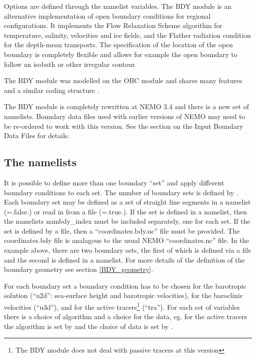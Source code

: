 Options are defined through the   
  namelist variables.
The BDY module is an alternative implementation of open boundary
conditions for regional configurations. It implements the Flow
Relaxation Scheme algorithm for temperature, salinity, velocities and
ice fields, and the Flather radiation condition for the depth-mean
transports. The specification of the location of the open boundary is
completely flexible and allows for example the open boundary to follow
an isobath or other irregular contour. 

The BDY module was modelled on the OBC module and shares many features
and a similar coding structure \citep{Chanut2005}.

The BDY module is completely rewritten at NEMO 3.4 and there is a new
set of namelists. Boundary data files used with earlier versions of
NEMO may need to be re-ordered to work with this version. See the
section on the Input Boundary Data Files for details.

\subsection{The namelists}
\label{BDY_namelist}

It is possible to define more than one boundary ``set'' and apply
different boundary conditions to each set. The number of boundary
sets is defined by .  Each boundary set may be defined
as a set of straight line segments in a namelist
(=.false.) or read in from a file
(=.true.). If the set is defined in a namelist,
then the namelists nambdy\_index must be included separately, one for
each set. If the set is defined by a file, then a
``coordinates.bdy.nc'' file must be provided. The coordinates.bdy file
is analagous to the usual NEMO ``coordinates.nc'' file. In the example
above, there are two boundary sets, the first of which is defined via
a file and the second is defined in a namelist. For more details of
the definition of the boundary geometry see section
\ref{BDY_geometry}.

For each boundary set a boundary
condition has to be chosen for the barotropic solution (``u2d'':
sea-surface height and barotropic velocities), for the baroclinic
velocities (``u3d''), and for the active tracers\footnote{The BDY
  module does not deal with passive tracers at this version}
(``tra''). For each set of variables there is a choice of algorithm
and a choice for the data, eg. for the active tracers the algorithm is
set by  and the choice of data is set by
. 

